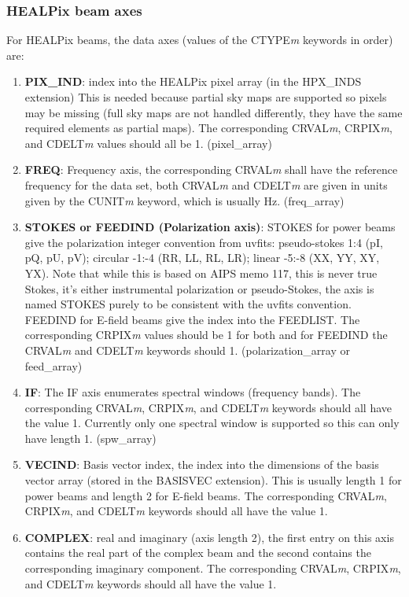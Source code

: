 \documentclass[11pt, oneside]{article}   	%
\begin{document}
\subsubsection{HEALPix beam axes}
For HEALPix beams, the data axes (values of the CTYPE\textit{m} keywords in order) are: 
\begin{enumerate}
\item{\textbf{PIX\_IND}: index into the HEALPix pixel array (in the HPX\_INDS extension) This is needed because partial sky maps are supported so pixels may be missing (full sky maps are not handled differently, they have the same required elements as partial maps). The corresponding CRVAL\textit{m}, CRPIX\textit{m}, and CDELT\textit{m} values should all be 1. (pixel\_array)}
\item{\textbf{FREQ}: Frequency axis, the corresponding CRVAL\textit{m} shall have the reference frequency for the data set, both CRVAL\textit{m} and CDELT\textit{m} are given in units given by the CUNIT\textit{m} keyword, which is usually Hz. (freq\_array)}
\item{\textbf{STOKES or FEEDIND (Polarization axis)}: STOKES for power beams give the polarization integer convention from uvfits: pseudo-stokes 1:4 (pI, pQ, pU, pV);  circular -1:-4 (RR, LL, RL, LR); linear -5:-8 (XX, YY, XY, YX). Note that while this is based on AIPS memo 117, this is never true Stokes, it's either instrumental polarization or pseudo-Stokes, the axis is named STOKES purely to be consistent with the uvfits convention.  FEEDIND for E-field beams give the index into the FEEDLIST. The corresponding CRPIX\textit{m} values should be 1 for both and for FEEDIND the CRVAL\textit{m} and CDELT\textit{m} keywords should 1. (polarization\_array or feed\_array)}
\item{\textbf{IF}: The IF axis enumerates spectral windows (frequency bands). The corresponding CRVAL\textit{m}, CRPIX\textit{m}, and CDELT\textit{m} keywords should all have the value 1. Currently only one spectral window is supported so this can only have length 1. (spw\_array)}
\item{\textbf{VECIND}: Basis vector index, the index into the dimensions of the basis vector array (stored in the BASISVEC extension). This is usually length 1 for power beams and length 2 for E-field beams. The corresponding CRVAL\textit{m}, CRPIX\textit{m}, and CDELT\textit{m} keywords should all have the value 1.}
\item{\textbf{COMPLEX}: real and imaginary (axis length 2), the first entry on this axis contains the real part of the complex beam and the second contains the corresponding imaginary component. The corresponding CRVAL\textit{m}, CRPIX\textit{m}, and CDELT\textit{m} keywords should all have the value 1.}
\end{enumerate}
\end{document}
